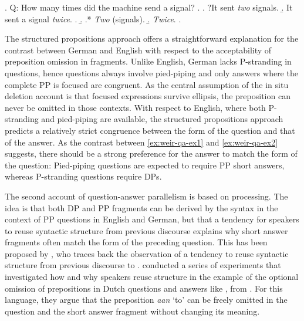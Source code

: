 \ex. \label{ex:weir-qa-ex2}
Q: How many times did the machine send a signal? \hfill \citep[1289]{weir2018}
\a. \a. ?It sent \textit{two} signals.
    \b. It sent a signal \textit{twice}.
    \z.
\b.
\a.* \textit{Two} (signals).
\b. \textit{Twice}.
\z.

The structured propositions approach offers a straightforward explanation for the contrast between German and English with respect to the acceptability of preposition omission in fragments. Unlike English, German lacks P-stranding in questions, hence questions always involve pied-piping and only answers where the complete PP is focused are congruent. As the central assumption of the in situ deletion account is that focused expressions survive ellipsis, the preposition can never be omitted in those contexts. With respect to English, where both P-stranding and pied-piping are available, the structured propositions approach predicts a relatively strict congruence between the form of the question and that of the answer. As the contrast between \ref{ex:weir-qa-ex1} and \ref{ex:weir-qa-ex2} suggests, there should be a strong preference for the answer to match the form of the question: Pied-piping questions are expected to require PP short answers, whereas P-stranding questions require DPs.

The second account of question-answer parallelism is based on processing. The idea is that both DP and PP fragments can be derived by the syntax in the context of PP questions in English and German, but that a tendency for speakers to reuse syntactic structure from previous discourse explains why short answer fragments often match the form of the preceding question. This has been proposed by \citet{nykiel2017}, who traces back the observation of a tendency to reuse syntactic structure from previous discourse to \citet{levelt.kelter1982}. \citet{levelt.kelter1982} conducted a series of experiments that investigated how and why speakers reuse structure in the example of the optional omission of prepositions in Dutch questions and answers like \Next, from \citet[80]{levelt.kelter1982}. For this language, they argue that the preposition \textit{aan} `to' can be freely omitted in the question and the short answer fragment without changing its meaning.

